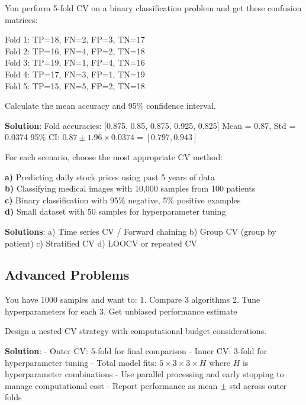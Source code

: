 \documentclass{article}
\newcounter{example}
\newcounter{exercise}
\begin{document}
\begin{tcolorbox}[colback=gray!5!white,colframe=gray!75!black,title=Problem \stepcounter{exercise}\#\theexercise: CV Score Calculation]

You perform 5-fold CV on a binary classification problem and get these confusion matrices:

Fold 1: TP=18, FN=2, FP=3, TN=17\\
Fold 2: TP=16, FN=4, FP=2, TN=18\\
Fold 3: TP=19, FN=1, FP=4, TN=16\\
Fold 4: TP=17, FN=3, FP=1, TN=19\\
Fold 5: TP=15, FN=5, FP=2, TN=18

Calculate the mean accuracy and 95\% confidence interval.

\textbf{Solution}:
Fold accuracies: [0.875, 0.85, 0.875, 0.925, 0.825]
Mean = 0.87, Std = 0.0374
95\% CI: $0.87 \pm 1.96 \times 0.0374 = [0.797, 0.943]$
\end{tcolorbox}

\begin{tcolorbox}[colback=gray!5!white,colframe=gray!75!black,title=Problem \stepcounter{exercise}\#\theexercise: Choosing the Right CV]

For each scenario, choose the most appropriate CV method:

\textbf{a)} Predicting daily stock prices using past 5 years of data\\
\textbf{b)} Classifying medical images with 10,000 samples from 100 patients\\
\textbf{c)} Binary classification with 95\% negative, 5\% positive examples\\
\textbf{d)} Small dataset with 50 samples for hyperparameter tuning

\textbf{Solutions}:
a) Time series CV / Forward chaining
b) Group CV (group by patient)
c) Stratified CV
d) LOOCV or repeated CV
\end{tcolorbox}

\subsection{Advanced Problems}

\begin{tcolorbox}[colback=gray!5!white,colframe=gray!75!black,title=Problem \stepcounter{exercise}\#\theexercise: Nested CV Analysis]

You have 1000 samples and want to:
1. Compare 3 algorithms
2. Tune hyperparameters for each
3. Get unbiased performance estimate

Design a nested CV strategy with computational budget considerations.

\textbf{Solution}:
- Outer CV: 5-fold for final comparison
- Inner CV: 3-fold for hyperparameter tuning
- Total model fits: $5 \times 3 \times 3 \times H$ where $H$ is hyperparameter combinations
- Use parallel processing and early stopping to manage computational cost
- Report performance as mean $\pm$ std across outer folds
\end{tcolorbox}
\end{document}
